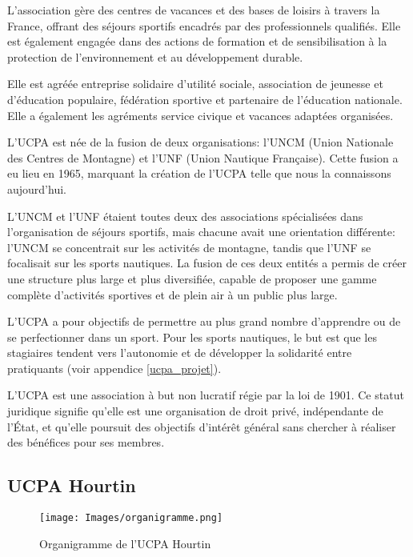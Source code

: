 \documentclass[11pt,a4paper]{report}
\begin{document}
L'association gère des centres de vacances et des bases de loisirs à travers la
France, offrant des séjours sportifs encadrés par des professionnels qualifiés.
Elle est également engagée dans des actions de formation et de sensibilisation 
à la protection de l'environnement et au développement durable.

Elle est agréée entreprise solidaire d’utilité sociale, association de
jeunesse et d’éducation populaire, fédération sportive et partenaire de 
l’éducation nationale. Elle a également les agréments service civique et
vacances adaptées organisées.

L'UCPA est  née de la fusion de deux organisations: l'UNCM 
(Union Nationale des Centres de Montagne) et l'UNF 
(Union Nautique Française). Cette fusion a eu lieu en 1965, 
marquant la création de l'UCPA telle que nous la connaissons
aujourd'hui.

L'UNCM et l'UNF étaient toutes deux des associations spécialisées
dans l'organisation de séjours sportifs, mais chacune avait une
orientation différente: l'UNCM se concentrait sur les activités 
de montagne, tandis que l'UNF se focalisait sur les sports nautiques. 
La fusion de ces deux entités a permis de créer une structure plus 
large et plus diversifiée, capable de proposer une gamme complète 
d'activités sportives et de plein air à un public plus large.

L'UCPA a pour objectifs de permettre au plus grand nombre
d'apprendre ou de se perfectionner dans un sport.
Pour les sports nautiques, le but est que les stagiaires
tendent vers l'autonomie  et de développer la solidarité entre
pratiquants (voir appendice \ref{ucpa_projet}).

L'UCPA est 
une association à but non lucratif régie par la loi de 1901. 
Ce statut juridique signifie qu'elle est une organisation de
droit privé, indépendante de l'État, et qu'elle poursuit des
objectifs d'intérêt général sans chercher à  réaliser des
bénéfices pour ses membres.

\subsection{UCPA Hourtin}
\begin{figure}[h]
\centering
\texttt{[image: Images/organigramme.png]} 
\caption{Organigramme de l'UCPA Hourtin\label{organi_hourtin}}
\end{figure}
\end{document}
